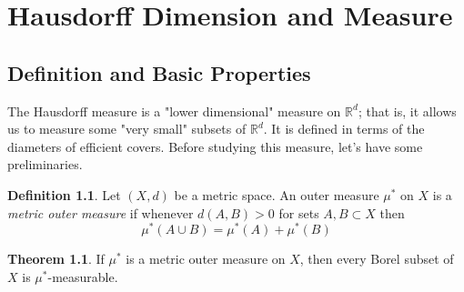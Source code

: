 \documentclass[12pt,a4paper]{report}
\theoremstyle{definition}
\newtheorem{theorem}{Theorem}
\newtheorem{definition}{Definition}
\begin{document}
\chapter{Hausdorff Dimension and Measure}

\section{Definition and Basic Properties}
The Hausdorff measure is a "lower dimensional" measure on $\mathbb{R}^d$; that is, it allows us to measure some "very small" subsets of $\mathbb{R}^d$. It is defined in terms of the diameters of efficient covers. Before studying this measure, let's have some preliminaries. \\

\begin{definition}
Let \((X, d)\) be a metric space. An outer measure \(\mu^*\) on \(X\) is a \textit{metric outer measure} if whenever $d(A, B) > 0$ for sets $A, B \subset X$ then
$$\mu^*(A \cup B) = \mu^*(A) + \mu^*(B)$$
\end{definition}


\begin{theorem} \label{thm1}
If \(\mu^*\) is a metric outer measure on \(X\), then every Borel subset of \(X\) is \(\mu^*\)-measurable.
\end{theorem}
\end{document}
